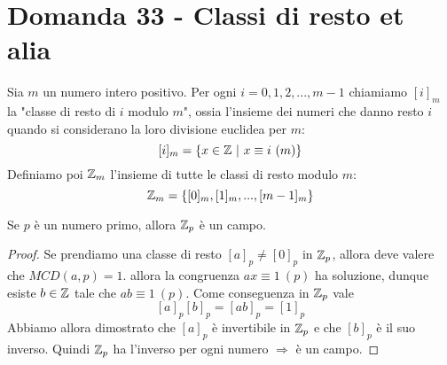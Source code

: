 \documentclass[]{article}
\begin{document}
\section{Domanda 33 - Classi di resto et alia}
Sia $m$ un numero intero positivo. Per ogni $i = 0,1,2,...,m-1$ chiamiamo $[i]_m$ la "classe di resto di $i$ modulo $m$", ossia l'insieme dei numeri che danno resto $i$ quando si considerano la loro divisione euclidea per $m$: $$[i]_m = \{x \in \campo{Z}\ |\ x \equiv i\ (m)\}$$
Definiamo poi $\mathbb{Z}_m$ l'insieme di tutte le classi di resto modulo $m$: $$\mathbb{Z}_m = \{ [0]_m, [1]_m, ..., [m-1]_m \}$$
\begin{lem}
Se $p$ è un numero primo, allora $\mathbb{Z}_p$ è un campo.
\end{lem}
\begin{proof}
Se prendiamo una classe di resto $[a]_p \not= [0]_p$ in $\mathbb{Z}_p$, allora deve valere che $MCD(a, p) = 1$. allora la congruenza $ax\equiv 1\ (p)$ ha soluzione, dunque esiste $b \in \mathbb{Z}$ tale che $ab \equiv 1\ (p)$. Come conseguenza in $\mathbb{Z}_p$ vale $$[a]_p[b]_p = [ab]_p = [1]_p$$
Abbiamo allora dimostrato che $[a]_p$ è invertibile in $\mathbb{Z}_p$ e che $[b]_p$ è il suo inverso. Quindi $\mathbb{Z}_p$ ha l'inverso per ogni numero $\Rightarrow$ è un campo.
\end{proof}
\end{document}
